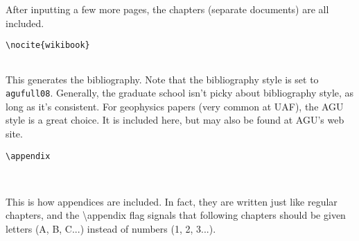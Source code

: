 After inputting a few more pages, the chapters (separate documents) are all
included.

\small
\begin{verbatim}
\nocite{wikibook}


\end{verbatim}
\normalsize

This generates the bibliography. Note that the bibliography style is set to
\texttt{agufull08}. Generally, the graduate school isn't picky about 
bibliography style, as long as it's consistent. For geophysics papers (very
common at UAF), the AGU style is a great choice. It is included here, but may
also be found at AGU's web site.

\small
\begin{verbatim}
\appendix



\end{verbatim}
\normalsize

This is how appendices are included. In fact, they are written just like
regular chapters, and the \textbackslash appendix flag signals that following
chapters should be given letters (A, B, C...) instead of numbers (1, 2, 3...).
